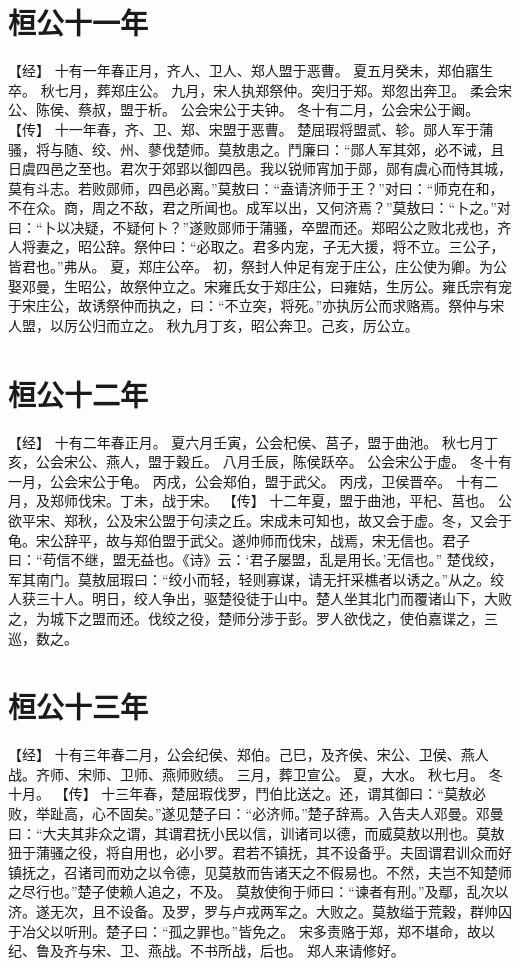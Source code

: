 \documentclass[a4paper,12pt,UTF8,twoside]{ctexbook}
\begin{document}
\section{桓公十一年}

【经】
十有一年春正月，齐人、卫人、郑人盟于恶曹。
夏五月癸未，郑伯寤生卒。
秋七月，葬郑庄公。
九月，宋人执郑祭仲。突归于郑。郑忽出奔卫。
柔会宋公、陈侯、蔡叔，盟于析。
公会宋公于夫钟。
冬十有二月，公会宋公于阚。
【传】
十一年春，齐、卫、郑、宋盟于恶曹。
楚屈瑕将盟贰、轸。郧人军于蒲骚，将与随、绞、州、蓼伐楚师。莫敖患之。鬥廉曰：“郧人军其郊，必不诫，且日虞四邑之至也。君次于郊郢以御四邑。我以锐师宵加于郧，郧有虞心而恃其城，莫有斗志。若败郧师，四邑必离。”莫敖曰：“盍请济师于王？”对曰：“师克在和，不在众。商，周之不敌，君之所闻也。成军以出，又何济焉？”莫敖曰：“卜之。”对曰：“卜以决疑，不疑何卜？”遂败郧师于蒲骚，卒盟而还。郑昭公之败北戎也，齐人将妻之，昭公辞。祭仲曰：“必取之。君多内宠，子无大援，将不立。三公子，皆君也。”弗从。
夏，郑庄公卒。
初，祭封人仲足有宠于庄公，庄公使为卿。为公娶邓曼，生昭公，故祭仲立之。宋雍氏女于郑庄公，曰雍姞，生厉公。雍氏宗有宠于宋庄公，故诱祭仲而执之，曰：“不立突，将死。”亦执厉公而求赂焉。祭仲与宋人盟，以厉公归而立之。
秋九月丁亥，昭公奔卫。己亥，厉公立。

\section{桓公十二年}

【经】
十有二年春正月。
夏六月壬寅，公会杞侯、莒子，盟于曲池。
秋七月丁亥，公会宋公、燕人，盟于穀丘。
八月壬辰，陈侯跃卒。
公会宋公于虚。
冬十有一月，公会宋公于龟。
丙戌，公会郑伯，盟于武父。
丙戌，卫侯晋卒。
十有二月，及郑师伐宋。丁未，战于宋。
【传】
十二年夏，盟于曲池，平杞、莒也。
公欲平宋、郑秋，公及宋公盟于句渎之丘。宋成未可知也，故又会于虚。冬，又会于龟。宋公辞平，故与郑伯盟于武父。遂帅师而伐宋，战焉，宋无信也。君子曰：“苟信不继，盟无益也。《诗》云：‘君子屡盟，乱是用长。’无信也。”
楚伐绞，军其南门。莫敖屈瑕曰：“绞小而轻，轻则寡谋，请无扞采樵者以诱之。”从之。绞人获三十人。明日，绞人争出，驱楚役徒于山中。楚人坐其北门而覆诸山下，大败之，为城下之盟而还。伐绞之役，楚师分涉于彭。罗人欲伐之，使伯嘉谍之，三巡，数之。

\section{桓公十三年}

【经】
十有三年春二月，公会纪侯、郑伯。己巳，及齐侯、宋公、卫侯、燕人战。齐师、宋师、卫师、燕师败绩。
三月，葬卫宣公。
夏，大水。
秋七月。
冬十月。
【传】
十三年春，楚屈瑕伐罗，鬥伯比送之。还，谓其御曰：“莫敖必败，举趾高，心不固矣。”遂见楚子曰：“必济师。”楚子辞焉。入告夫人邓曼。邓曼曰：“大夫其非众之谓，其谓君抚小民以信，训诸司以德，而威莫敖以刑也。莫敖狃于蒲骚之役，将自用也，必小罗。君若不镇抚，其不设备乎。夫固谓君训众而好镇抚之，召诸司而劝之以令德，见莫敖而告诸天之不假易也。不然，夫岂不知楚师之尽行也。”楚子使赖人追之，不及。
莫敖使徇于师曰：“谏者有刑。”及鄢，乱次以济。遂无次，且不设备。及罗，罗与卢戎两军之。大败之。莫敖缢于荒穀，群帅囚于冶父以听刑。楚子曰：“孤之罪也。”皆免之。
宋多责赂于郑，郑不堪命，故以纪、鲁及齐与宋、卫、燕战。不书所战，后也。
郑人来请修好。
\end{document}
